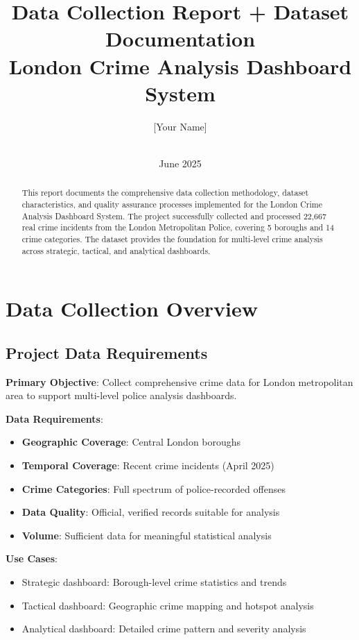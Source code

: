 \documentclass[12pt,a4paper]{article}
\title{\textbf{Data Collection Report + Dataset Documentation\\London Crime Analysis Dashboard System}}
\author{[Your Name] \\ [Course Name] \\ [University Name]}
\date{June 2025}
\begin{document}
\maketitle
\thispagestyle{fancy}

\begin{abstract}
This report documents the comprehensive data collection methodology, dataset characteristics, and quality assurance processes implemented for the London Crime Analysis Dashboard System. The project successfully collected and processed 22,667 real crime incidents from the London Metropolitan Police, covering 5 boroughs and 14 crime categories. The dataset provides the foundation for multi-level crime analysis across strategic, tactical, and analytical dashboards.
\end{abstract}

\tableofcontents
\newpage

\section{Data Collection Overview}

\subsection{Project Data Requirements}

\textbf{Primary Objective}: Collect comprehensive crime data for London metropolitan area to support multi-level police analysis dashboards.

\textbf{Data Requirements}:
\begin{itemize}
    \item \textbf{Geographic Coverage}: Central London boroughs
    \item \textbf{Temporal Coverage}: Recent crime incidents (April 2025)
    \item \textbf{Crime Categories}: Full spectrum of police-recorded offenses
    \item \textbf{Data Quality}: Official, verified records suitable for analysis
    \item \textbf{Volume}: Sufficient data for meaningful statistical analysis
\end{itemize}

\textbf{Use Cases}:
\begin{itemize}
    \item Strategic dashboard: Borough-level crime statistics and trends
    \item Tactical dashboard: Geographic crime mapping and hotspot analysis
    \item Analytical dashboard: Detailed crime pattern and severity analysis
\end{itemize}
\end{document}
